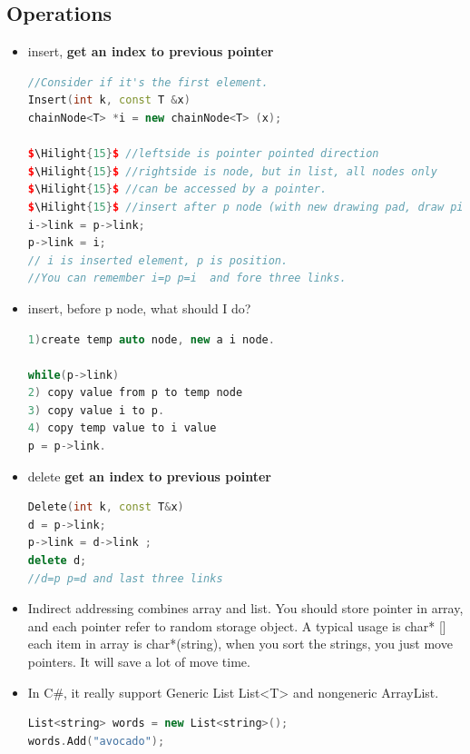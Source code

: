 \documentclass[a4paper,12pt,twoside]{book}
\newcommand{\Hilight}[1]{\makebox[0pt][l]{\color{yellow}\rule[-3pt]{#1em}{11pt}}}
\begin{document}
\subsection{Operations}
\begin{itemize}
\item insert, \textbf{get an index to previous pointer}
\begin{lstlisting}[frame=single, language=c++, mathescape=true]
//Consider if it's the first element. 
Insert(int k, const T &x)
chainNode<T> *i = new chainNode<T> (x);

$\Hilight{15}$ //leftside is pointer pointed direction
$\Hilight{15}$ //rightside is node, but in list, all nodes only 
$\Hilight{15}$ //can be accessed by a pointer.
$\Hilight{15}$ //insert after p node (with new drawing pad, draw picture here.)
i->link = p->link;
p->link = i;
// i is inserted element, p is position.  
//You can remember i=p p=i  and fore three links.
\end{lstlisting}

\item insert, before p node, what should I do?
\begin{lstlisting}[frame=single, language=c++, mathescape=true]
1)create temp auto node, new a i node.
 
while(p->link) 
2) copy value from p to temp node
3) copy value i to p.
4) copy temp value to i value
p = p->link.  
\end{lstlisting}

\item delete \textbf{get an index to previous pointer}
\begin{lstlisting}[frame=single, language=c++]
Delete(int k, const T&x)
d = p->link;
p->link = d->link ;
delete d;
//d=p p=d and last three links
\end{lstlisting}

\item Indirect addressing combines array and list. You should store pointer in array, and each pointer refer to random storage object. A typical usage is char* [] each item in array is char*(string), when you sort the strings, you just move pointers. It will save a lot of move time.  
\item In C\#, it really support Generic List List<T> and nongeneric ArrayList. 
\begin{lstlisting}[frame=single, language=c++]
List<string> words = new List<string>();
words.Add("avocado");
\end{lstlisting}

\end{itemize} 
\end{document}
